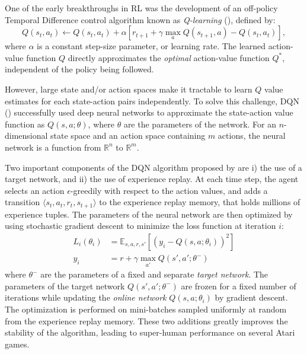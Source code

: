 \documentclass{article}
\begin{document}
    One of the early breakthroughs in RL was the development of an off-policy Temporal Difference control algorithm known as \emph{Q-learning} (\cite{qlearning}), defined by:
    \begin{equation}
        Q(s_{t}, a_{t}) \leftarrow Q(s_{t}, a_{t}) + \alpha \left[ r_{t+1} + \gamma \max_{a} Q(s_{t+1}, a) - Q(s_{t}, a_{t}) \right],
    \end{equation}
    where $\alpha$ is a constant step-size parameter, or learning rate.
    The learned action-value function $Q$ directly approximates the \emph{optimal} action-value function $Q^{*}$, independent of the policy being followed.

    However, large state and/or action spaces make it tractable to learn $Q$ value estimates for each state-action pairs independently.
    To solve this challenge, DQN (\cite{dqn}) successfully used deep neural networks to approximate the state-action value function as $Q(s, a; \theta)$, where $\theta$ are the parameters of the network.
    For an $n$-dimensional state space and an action space containing $m$ actions, the neural network is a function from $\mathbb{R}^{n}$ to $\mathbb{R}^{m}$.

    Two important components of the DQN algorithm proposed by \cite{dqn} are i) the use of a target network, and ii) the use of experience replay.
    At each time step, the agent selects an action $\epsilon$-greedily with respect to the action values, and adds a transition $\langle s_{t}, a_{t}, r_{t}, s_{t+1} \rangle$ to the experience replay memory, that holds millions of experience tuples.
    The parameters of the neural network are then optimized by using stochastic gradient descent to minimize the loss function at iteration $i$:
    \begin{align}
        L_{i}(\theta_{i}) &= \mathbb{E}_{s, a, r, s'} \left[ \left( y_{i} - Q(s, a; \theta_{i}) \right)^2 \right] \\
        y_{i} &= r + \gamma \max_{a'}Q(s', a'; \theta^{-})
    \end{align}
    where $\theta^{-}$ are the parameters of a fixed and separate \emph{target network}.
    The parameters of the target network $Q(s', a'; \theta^{-})$ are frozen for a fixed number of iterations while updating the \emph{online network} $Q(s, a; \theta_{i})$ by gradient descent.
    The optimization is performed on mini-batches sampled uniformly at random from the experience replay memory.
    These two additions greatly improves the stability of the algorithm, leading to super-human performance on several Atari games.
\end{document}
